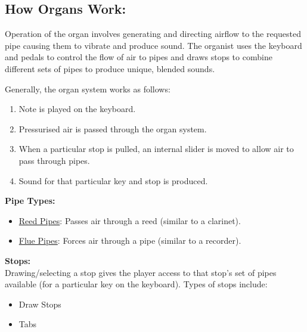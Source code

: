 \noindent \subsection{How Organs Work:}
\hspace{0.5cm} Operation of the organ involves generating and directing airflow to the requested pipe causing them to vibrate and produce sound. The organist uses the keyboard and pedals to control the flow of air to pipes and draws stops to combine different sets of pipes to produce unique, blended sounds.  \cite{organvideo}

\noindent Generally, the organ system works as follows:
\vspace{-0.15cm}
\begin{enumerate}
    \itemsep0em 
\item Note is played on the keyboard.
\vspace{-0.1cm}
\item Pressurised air is passed through the organ system.
\vspace{-0.1cm}
\item When a particular stop is pulled, an internal slider is moved to allow air to pass through pipes.
\vspace{-0.1cm}
\item Sound for that particular key and stop is produced.
\end{enumerate}
\vspace{-0.1cm}

\noindent \textbf{Pipe Types:}
\vspace{-0.15cm}
\begin{itemize}
    \itemsep0em 
\item \underline{Reed Pipes}: Passes air through a reed (similar to a clarinet).
\item \underline{Flue Pipes}: Forces air through a pipe (similar to a recorder).
\end{itemize}
\vspace{-0.2cm}
\cite{organvideo}

\noindent \textbf{Stops:}
\\ \hspace*{0.5cm}Drawing/selecting a stop gives the player access to that stop's set of pipes available (for a particular key on the keyboard). Types of stops include:
\vspace{-0.15cm}
\begin{itemize}
    \itemsep0em 
\item Draw Stops
\vspace{-0.1cm}
\item Tabs
\end{itemize}
\vspace{-0.15cm}

